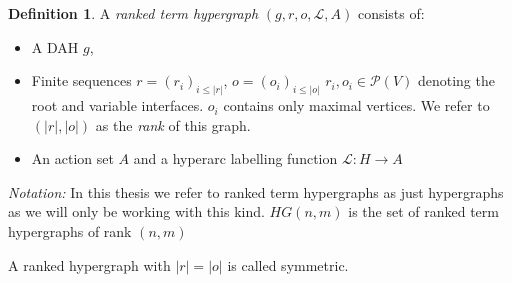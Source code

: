 \documentclass[12pt]{article}
\theoremstyle{definition}
\newtheorem{definition}[theorem]{Definition}
\renewcommand{\P}{\mathcal{P}}
\newcommand{\1}{\mathbbm{1}}
\renewcommand{\L}{\mathcal{L}}
\begin{document}
\begin{definition}
A \emph{ranked term hypergraph} $(g, r, o, \L, A)$ consists of:
\begin{itemize}
\item A DAH $g$,
\item Finite sequences $r = (r_i)_{i\leq |r|}$, $o = (o_i)_{i\leq |o|}$ $r_i, o_i\in \P(V)$ denoting the root and variable interfaces. $o_i$ contains only maximal vertices. We refer to $(|r|, |o|)$ as the \emph{rank} of this graph.
\item An action set $A$ and a hyperarc labelling function $\L: H\to A$
\end{itemize}
\end{definition}
\emph{Notation:} In this thesis we refer to ranked term hypergraphs as just hypergraphs as we will only be working with this kind. $HG(n,m)$ is the set of ranked term  hypergraphs of rank $(n,m)$

A ranked hypergraph with $|r| = |o|$ is called symmetric.
\end{document}
